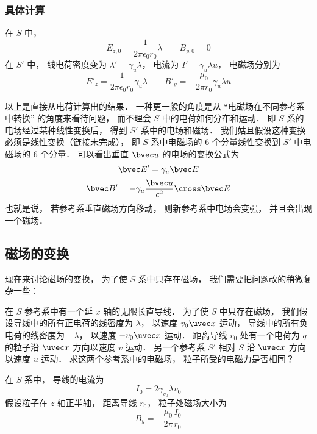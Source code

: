 \subsubsection{具体计算}
在 $S$ 中，
\begin{equation}
E_{z,0} = \frac{1}{2\pi\epsilon_0 r_0} \lambda
\qquad
B_{y,0} = 0
\end{equation}
在 $S'$ 中， 线电荷密度变为 $\lambda' = \gamma_u \lambda$， 电流为 $I' = \gamma_u \lambda u$， 电磁场分别为
\begin{equation}
E'_z = \frac{1}{2\pi\epsilon_0 r_0} \gamma_u \lambda
\qquad
B'_y = -\frac{\mu_0}{2\pi r_0}\gamma_u \lambda u
\end{equation}

以上是直接从电荷计算出的结果． 一种更一般的角度是从 “电磁场在不同参考系中转换” 的角度来看待问题， 而不理会 $S$ 中的电荷如何分布和运动． 即 $S$ 系的电场经过某种线性变换后， 得到 $S'$ 系中的电场和磁场． 我们姑且假设这种变换必须是线性变换（链接未完成）， 即 $S$ 系中电磁场的 6 个分量线性变换到 $S'$ 中电磁场的 6 个分量． 可以看出垂直 $\bvec u$ 的电场的变换公式为
\begin{equation}\label{EMRef_eq5}
\bvec E' = \gamma_u \bvec E
\end{equation}
\begin{equation}\label{EMRef_eq6}
\bvec B' = -\gamma_u \frac{\bvec u}{c^2} \cross \bvec E
\end{equation}
也就是说， 若参考系垂直磁场方向移动， 则新参考系中电场会变强， 并且会出现一个磁场．


\subsection{磁场的变换}
现在来讨论磁场的变换， 为了使 $S$ 系中只存在磁场， 我们需要把问题改的稍微复杂一些：

在 $S$ 参考系中有一个延 $x$ 轴的无限长直导线． 为了使 $S$ 中只存在磁场， 我们假设导线中的所有正电荷的线密度为 $\lambda$， 以速度 $v_0\uvec x$ 运动， 导线中的所有负电荷的线密度为 $-\lambda$，  以速度 $-v_0\uvec x$ 运动． 距离导线 $r_0$ 处有一个电荷为 $q$ 的粒子沿 $\uvec x$ 方向以速度 $v$ 运动． 另一个参考系 $S'$ 相对 $S$ 沿 $\uvec x$ 方向以速度 $u$ 运动． 求这两个参考系中的电磁场， 粒子所受的电磁力是否相同？

在 $S$ 系中， 导线的电流为
\begin{equation}
I_0 = 2 \gamma_{v_0}\lambda v_0
\end{equation}
假设粒子在 $z$ 轴正半轴， 距离导线 $r_0$， 粒子处磁场大小为
\begin{equation}
B_y = -\frac{\mu_0}{2\pi} \frac{I_0}{r_0}
\end{equation}


